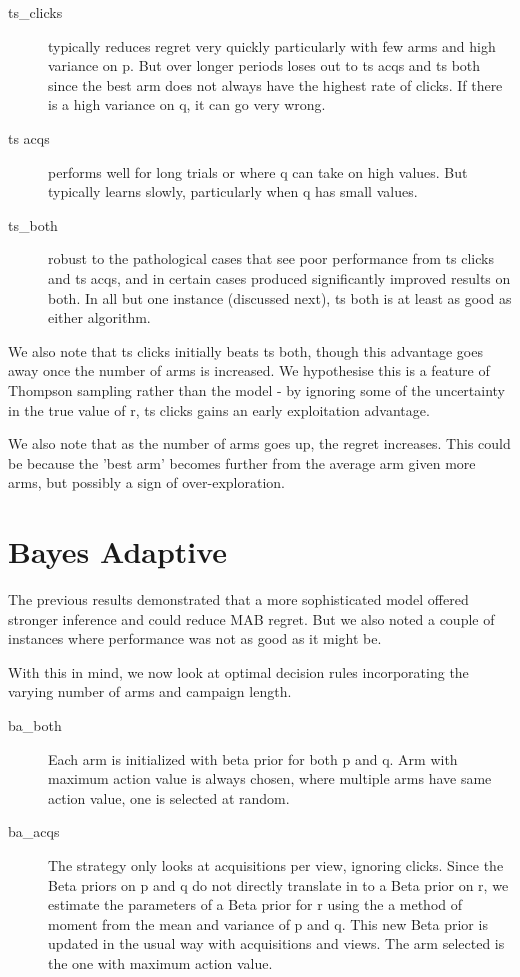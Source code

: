 \documentclass[11pt,a4,singlespacing,titlepagenumber=on]{scrreprt}
\numberwithin{equation}{chapter} %
\theoremstyle{remark}
\begin{document}
\begin{description}
	\item[ts\_clicks] typically reduces regret very quickly particularly with few arms and high variance on p. But over longer periods loses out to ts acqs and ts both since the best arm does not always have the highest rate of clicks. If there is a high variance on q, it can go very wrong.
	\item[ts acqs] performs well for long trials or where q can take on high values. But typically learns slowly, particularly when q has small values.
	\item[ts\_both] robust to the pathological cases that see poor performance from ts clicks and ts acqs, and in certain cases produced significantly improved results on both. In all but one instance (discussed next), ts both is at least as good as either algorithm.

\end{description}

We also note that ts clicks initially beats ts both, though this advantage goes away once the number of arms is increased. We hypothesise this is a feature of Thompson sampling rather than the model - by ignoring some of the uncertainty in the true value of r, ts clicks gains an early exploitation advantage.

We also note that as the number of arms goes up, the regret increases. This could be because the 'best arm' becomes further from the average arm given more arms, but possibly a sign of over-exploration.


\section{ Bayes Adaptive }

The previous results demonstrated that a more sophisticated model offered stronger inference and could reduce MAB regret. But we also noted a couple of instances where performance was not as good as it might be. 

With this in mind, we now look at optimal decision rules incorporating the varying number of arms and campaign length.

\begin{description}
	\item[ba\_both] Each arm is initialized with beta prior for both p and q. Arm with maximum action value is always chosen, where multiple arms have same action value, one is selected at random.
	\item[ba\_acqs] The strategy only looks at acquisitions per view, ignoring clicks. Since the Beta priors on p and q do not directly translate in to a Beta prior on r, we estimate the parameters of a Beta prior for r using the a method of moment from the mean and variance of p and q. This new Beta prior is updated in the usual way with acquisitions and views. The arm selected is the one with maximum action value.
\end{description}
\end{document}
